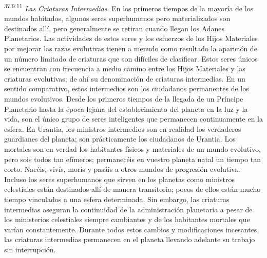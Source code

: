 \par
\textsuperscript{37:9.11} \textit{Las Criaturas Intermedias}. En los primeros tiempos de la mayoría de los mundos habitados, algunos seres superhumanos pero materializados son destinados allí, pero generalmente se retiran cuando llegan los Adanes Planetarios. Las actividades de estos seres y los esfuerzos de los Hijos Materiales por mejorar las razas evolutivas tienen a menudo como resultado la aparición de un número limitado de criaturas que son difíciles de clasificar. Estos seres únicos se encuentran con frecuencia a medio camino entre los Hijos Materiales y las criaturas evolutivas; de ahí su denominación de criaturas intermedias. En un sentido comparativo, estos intermedios son los ciudadanos permanentes de los mundos evolutivos. Desde los primeros tiempos de la llegada de un Príncipe Planetario hasta la época lejana del establecimiento del planeta en la luz y la vida, son el único grupo de seres inteligentes que permanecen continuamente en la esfera. En Urantia, los ministros intermedios son en realidad los verdaderos guardianes del planeta; son prácticamente los ciudadanos de Urantia. Los mortales son en verdad los habitantes físicos y materiales de un mundo evolutivo, pero sois todos tan efímeros; permanecéis en vuestro planeta natal un tiempo tan corto. Nacéis, vivís, morís y pasáis a otros mundos de progresión evolutiva. Incluso los seres superhumanos que sirven en los planetas como ministros celestiales están destinados allí de manera transitoria; pocos de ellos están mucho tiempo vinculados a una esfera determinada. Sin embargo, las criaturas intermedias aseguran la continuidad de la administración planetaria a pesar de los ministerios celestiales siempre cambiantes y de los habitantes mortales que varían constantemente. Durante todos estos cambios y modificaciones incesantes, las criaturas intermedias permanecen en el planeta llevando adelante su trabajo sin interrupción.

